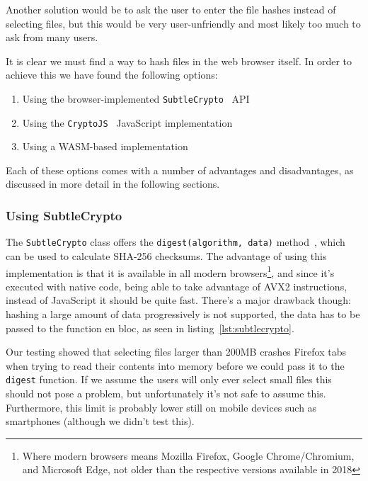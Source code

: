 Another solution would be to ask the user to enter the file hashes instead of selecting files,
but this would be very user-unfriendly and most likely too much to ask from many users.

It is clear we must find a way to hash files in the web browser itself.
In order to achieve this we have found the following options:

\begin{enumerate}
    \item Using the browser-implemented \texttt{SubtleCrypto}~\cite{subtlecrypto} \gls{API}
    \item Using the \texttt{CryptoJS}~\cite{cryptojs} JavaScript implementation
    \item Using a \gls{WASM}-based implementation
\end{enumerate}

Each of these options comes with a number of advantages and disadvantages, as discussed in more detail in the following sections.

\subsubsection{Using SubtleCrypto}
\label{subsec:subtlecrypto}
The \texttt{SubtleCrypto} class offers the \texttt{digest(algorithm, data)} method~\cite{subtlecrypto}, which can be used to
calculate \gls{SHA-256} checksums.
The advantage of using this implementation is that it is available in all modern browsers\footnote{Where modern browsers means Mozilla Firefox, Google Chrome/Chromium, and Microsoft Edge, not older than the respective versions available in 2018},
and since it's executed with native code, being able to take advantage of \gls{AVX2} instructions, instead of JavaScript it should be quite fast.
There's a major drawback though: hashing a large amount of data progressively is not supported, the data has to be
passed to the function en bloc, as seen in listing~\ref{lst:subtlecrypto}.



Our testing showed that selecting files larger than 200MB crashes Firefox tabs when trying to read their contents
into memory before we could pass it to the \texttt{digest} function.
If we assume the users will only ever select small files this should not pose a problem, but unfortunately it's not safe to assume this.
Furthermore, this limit is probably lower still on mobile devices such as smartphones (although we didn't test this).

